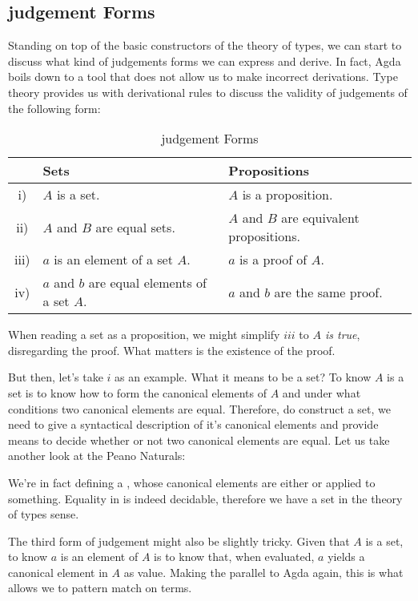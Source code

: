 \subsection{judgement Forms}
Standing on top of the basic constructors of the theory of types, we can start to discuss
what kind of judgements forms we can express and derive. In fact, Agda boils down to a tool
that does not allow us to make incorrect derivations. Type theory provides us with derivational 
rules to discuss the validity of judgements of the following form:

\begin{center}
\begin{table}[h]
\begin{tabular}{c l l}
       & Sets & Propositions \\ \hline
  i)   & $A$ is a set. & $A$ is a proposition. \\
  ii)  & $A$ and $B$ are equal sets. & $A$ and $B$ are equivalent propositions. \\
  iii) & $a$ is an element of a set $A$. & $a$ is a proof of $A$. \\
  iv)  & $a$ and $b$ are equal elements of a set $A$. & $a$ and $b$ are the same proof. \\  
\end{tabular}
\caption{judgement Forms}
\end{table}
\end{center}

When reading a set as a proposition, we might simplify $iii$ to \emph{$A$ is true}, disregarding
the proof. What matters is the existence of the proof.

But then, let's take $i$ as an example. What it means to be a set? To know $A$ is a set is
to know how to form the canonical elements of $A$ and under what conditions two canonical
elements are equal. Therefore, do construct a set, we need to give a syntactical description
of it's canonical elements and provide means to decide whether or not two canonical elements
are equal. Let us take another look at the Peano Naturals:


We're in fact defining a , whose canonical elements are either  or
 applied to something. Equality in  is indeed decidable, therefore we have a set
in the theory of types sense.

The third form of judgement might also be slightly tricky. Given that $A$ is a set, 
to know $a$ is an element of $A$ is to know that, when evaluated, $a$ yields a canonical element in $A$
as value. Making the parallel to Agda again, this is what allows we to pattern match on terms.

